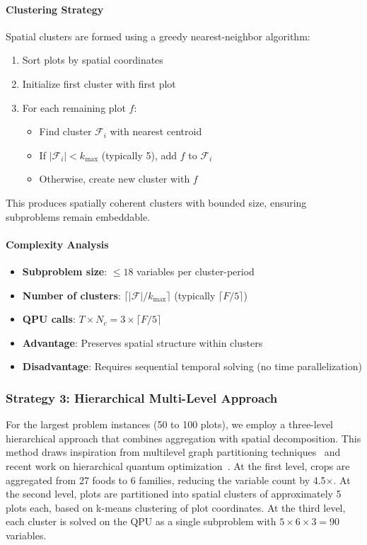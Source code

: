 \documentclass{oqireport}
\begin{document}
\paragraph{Clustering Strategy}

Spatial clusters are formed using a greedy nearest-neighbor algorithm:
\begin{enumerate}
    \item Sort plots by spatial coordinates
    \item Initialize first cluster with first plot
    \item For each remaining plot $f$:
        \begin{itemize}
            \item Find cluster $\mathcal{F}_i$ with nearest centroid
            \item If $|\mathcal{F}_i| < k_{\max}$ (typically 5), add $f$ to $\mathcal{F}_i$
            \item Otherwise, create new cluster with $f$
        \end{itemize}
\end{enumerate}

This produces spatially coherent clusters with bounded size, ensuring subproblems remain embeddable.

\paragraph{Complexity Analysis}
\begin{itemize}
\item \textbf{Subproblem size}: $\leq 18$ variables per cluster-period
\item \textbf{Number of clusters}: $\lceil |\mathcal{F}| / k_{\max} \rceil$ (typically $\lceil F/5 \rceil$)
\item \textbf{QPU calls}: $T \times N_c = 3 \times \lceil F/5 \rceil$
\item \textbf{Advantage}: Preserves spatial structure within clusters
\item \textbf{Disadvantage}: Requires sequential temporal solving (no time parallelization)
\end{itemize}

\subsubsection{Strategy 3: Hierarchical Multi-Level Approach}

For the largest problem instances (50 to 100 plots), we employ a three-level hierarchical approach that combines aggregation with spatial decomposition. This method draws inspiration from multilevel graph partitioning techniques~\cite{karypis1998fast, hendrickson1995multilevel} and recent work on hierarchical quantum optimization~\cite{dash2025hierarchicalquantumoptimizationlargescale}. At the first level, crops are aggregated from 27 foods to 6 families, reducing the variable count by 4.5$\times$. At the second level, plots are partitioned into spatial clusters of approximately 5 plots each, based on k-means clustering of plot coordinates. At the third level, each cluster is solved on the QPU as a single subproblem with $5 \times 6 \times 3 = 90$ variables.
\end{document}

